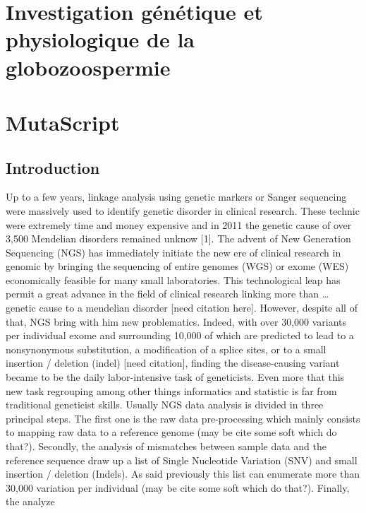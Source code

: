 \documentclass[12pt,twoside]{reedthesis}
\theoremstyle{definition}
\theoremstyle{definition}
\theoremstyle{remark}
\begin{document}
  \chapter{Investigation génétique et physiologique de la
  globozoospermie}\label{globo}
  
  \chapter{MutaScript}\label{mutascript}
  
  \section{Introduction}\label{introduction}
  
  Up to a few years, linkage analysis using genetic markers or Sanger
  sequencing were massively used to identify genetic disorder in clinical
  research. These technic were extremely time and money expensive and in
  2011 the genetic cause of over 3,500 Mendelian disorders remained unknow
  {[}1{]}. The advent of New Generation Sequencing (NGS) has immediately
  initiate the new ere of clinical research in genomic by bringing the
  sequencing of entire genomes (WGS) or exome (WES) economically feasible
  for many small laboratories. This technological leap has permit a great
  advance in the field of clinical research linking more than \ldots{}
  genetic cause to a mendelian disorder {[}need citation here{]}. However,
  despite all of that, NGS bring with him new problematics. Indeed, with
  over 30,000 variants per individual exome and surrounding 10,000 of
  which are predicted to lead to a nonsynonymous substitution, a
  modification of a splice sites, or to a small insertion / deletion
  (indel) {[}need citation{]}, finding the disease-causing variant became
  to be the daily labor-intensive task of geneticists. Even more that this
  new task regrouping among other things informatics and statistic is far
  from traditional geneticist skills. Usually NGS data analysis is divided
  in three principal steps. The first one is the raw data pre-processing
  which mainly consists to mapping raw data to a reference genome (may be
  cite some soft which do that?). Secondly, the analysis of mismatches
  between sample data and the reference sequence draw up a list of Single
  Nucleotide Variation (SNV) and small insertion / deletion (Indels). As
  said previously this list can enumerate more than 30,000 variation per
  individual (may be cite some soft which do that?). Finally, the analyze
\end{document}
